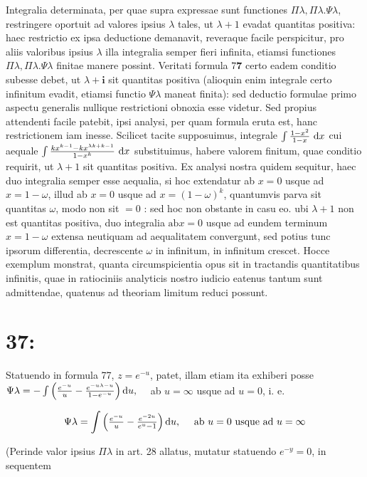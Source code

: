 \documentclass[twoside,12pt, showframe]{memoir}
\let\oldfrac\frac
\def\frac#1#2{\mathchoice{\tfrac{#1}{#2}}{\oldfrac{#1}{#2}}{\genfrac{}{}{}{2}{#1}{#2\mathstrut}}{\genfrac{}{}{}{3}{#1}{#2\mathstrut}}}
\begin{document}
Integralia determinata, per quae supra expressae sunt functiones \(\Pi \lambda, \Pi \lambda . \Psi \lambda\), restringere oportuit ad valores ipsius \(\lambda\) tales, ut \(\lambda+1\) evadat quantitas positiva: haec restrictio ex ipsa deductione demanavit, reveraque facile perspicitur, pro aliis valoribus ipsius \(\lambda\) illa integralia semper fieri infinita, etiamsi functiones \(\Pi \lambda, \Pi \lambda . \Psi \lambda\) finitae manere possint. Veritati formula \(7 \mathbf{7}\) certo eadem conditio subesse debet, ut \(\lambda+\mathbf{i}\) sit quantitas positiva (alioquin enim integrale certo infinitum evadit, etiamsi functio \(\Psi \lambda\) maneat finita): sed deductio formulae primo aspectu generalis nullique restrictioni obnoxia esse videtur. Sed propius attendenti facile patebit, ipsi analysi, per quam formula eruta est, hanc restrictionem iam inesse. Scilicet tacite supposuimus, integrale \(\int \frac{1-x^{2}}{1-x} \mathrm{~d} x\) cui aequale \(\int \frac{k x^{k-1}-k x^{\lambda k+k-1}}{1-x^{k}} \mathrm{~d} x\) substituimus, habere valorem finitum, quae conditio requirit, ut \(\lambda+1\) sit quantitas positiva. Ex analysi nostra quidem sequitur, haec duo integralia semper esse aequalia, si hoc extendatur ab \(x=0\) usque ad \(x=1-\omega\), illud ab \(x=0\) usque ad \(x=(1-\omega)^{k}\), quantumvis parva sit quantitas \(\omega\), modo non sit \(=0\) : sed hoc non obstante in casu eo. ubi \(\lambda+1\) non est quantitas positiva, duo integralia \(\mathrm{ab} x=0\) usque ad eundem terminum \(x=1-\omega\) extensa neutiquam ad aequalitatem convergunt, sed potius tunc ipsorum differentia, decrescente \(\omega\) in infinitum, in infinitum crescet. Hocce exemplum monstrat, quanta circumspicientia opus sit in tractandis quantitatibus infinitis, quae in ratiociniis analyticis nostro iudicio eatenus tantum sunt admittendae, quatenus ad theoriam limitum reduci possunt.

\section*{37:}
Statuendo in formula 77, \(z=e^{-u}\), patet, illam etiam ita exhiberi posse \(\Psi \lambda=-\int\left(\frac{e^{-u}}{u}-\frac{e^{-u \lambda-u}}{1-e^{-u}}\right) \mathrm{d} u, \quad\) ab \(u=\infty\) usque ad \(u=0\), i. e.

\[
\Psi \lambda=\int\left(\frac{e^{-u}}{u}-\frac{e^{-2 u}}{e^{u}-1}\right) \mathrm{d} u, \quad \text { ab } u=0 \text { usque ad } u=\infty
\]

(Perinde valor ipsius \(\Pi \lambda\) in art. 28 allatus, mutatur statuendo \(e^{-y}=0\), in sequentem
\end{document}
